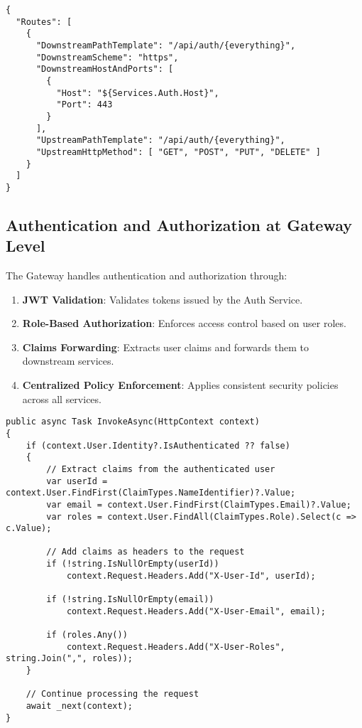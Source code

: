 \begin{verbatim}
{
  "Routes": [
    {
      "DownstreamPathTemplate": "/api/auth/{everything}",
      "DownstreamScheme": "https",
      "DownstreamHostAndPorts": [
        {
          "Host": "${Services.Auth.Host}",
          "Port": 443
        }
      ],
      "UpstreamPathTemplate": "/api/auth/{everything}",
      "UpstreamHttpMethod": [ "GET", "POST", "PUT", "DELETE" ]
    }
  ]
}
\end{verbatim}

\subsection{Authentication and Authorization at Gateway Level}

The Gateway handles authentication and authorization through:

\begin{enumerate}
   \item \textbf{JWT Validation}: Validates tokens issued by the Auth Service.
   \item \textbf{Role-Based Authorization}: Enforces access control based on user roles.
   \item \textbf{Claims Forwarding}: Extracts user claims and forwards them to downstream services.
   \item \textbf{Centralized Policy Enforcement}: Applies consistent security policies across all services.
\end{enumerate}

\begin{verbatim}
public async Task InvokeAsync(HttpContext context)
{
    if (context.User.Identity?.IsAuthenticated ?? false)
    {
        // Extract claims from the authenticated user
        var userId = context.User.FindFirst(ClaimTypes.NameIdentifier)?.Value;
        var email = context.User.FindFirst(ClaimTypes.Email)?.Value;
        var roles = context.User.FindAll(ClaimTypes.Role).Select(c => c.Value);
        
        // Add claims as headers to the request
        if (!string.IsNullOrEmpty(userId))
            context.Request.Headers.Add("X-User-Id", userId);
            
        if (!string.IsNullOrEmpty(email))
            context.Request.Headers.Add("X-User-Email", email);
            
        if (roles.Any())
            context.Request.Headers.Add("X-User-Roles", string.Join(",", roles));
    }
    
    // Continue processing the request
    await _next(context);
}
\end{verbatim}

